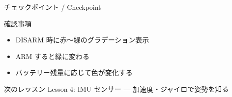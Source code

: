 \begin{frame}{チェックポイント / Checkpoint}
  \begin{alertblock}{確認事項}
    \begin{itemize}
      \item[$\square$] DISARM 時に赤〜緑のグラデーション表示
      \item[$\square$] ARM すると緑に変わる
      \item[$\square$] バッテリー残量に応じて色が変化する
    \end{itemize}
  \end{alertblock}

  \vspace{1em}

  \begin{block}{次のレッスン}
    Lesson 4: IMU センサー --- 加速度・ジャイロで姿勢を知る
  \end{block}
\end{frame}

